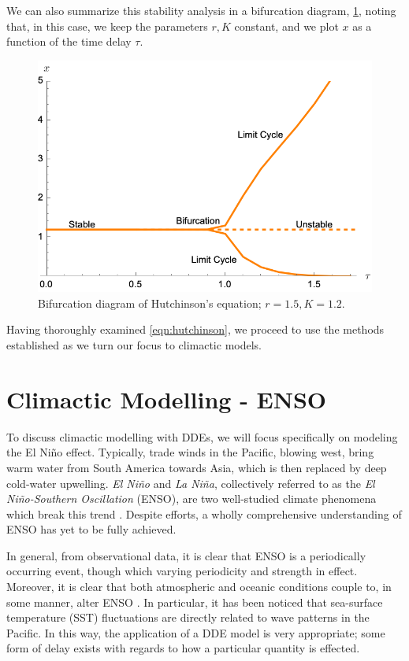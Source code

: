 \documentclass[12pt]{article}
\begin{document}
We can also summarize this stability analysis in a bifurcation diagram, \cref{fig:bifurcationdiagramex2}, noting that, in this case, we keep the parameters $r, K$ constant, and we plot $x$ as a function of the time delay $\tau$.

\begin{figure}[!ht]
    \centering
    \includegraphics*[width=0.4\linewidth]{figures/bifurcationdiagramexample2.png}
    \caption{Bifurcation diagram of Hutchinson's equation; $r = 1.5, K = 1.2$.}
    \label{fig:bifurcationdiagramex2}
\end{figure}

Having thoroughly examined \cref{eqn:hutchinson}, we proceed to use the methods established as we turn our focus to climactic models.
\newpage

\section{Climactic Modelling - ENSO}

To discuss climactic modelling with DDEs, we will focus specifically on modeling the El Niño effect. Typically, trade winds in the Pacific, blowing west, bring warm water from South America towards Asia, which is then replaced by deep cold-water upwelling. \emph{El Niño} and \emph{La Niña}, collectively referred to as the \emph{El Niño-Southern Oscillation} (ENSO), are two well-studied climate phenomena which break this trend \cite{aboutelnino}. Despite efforts, a wholly comprehensive understanding of ENSO has yet to be fully achieved.

In general, from observational data, it is clear that ENSO is a periodically occurring event, though which varying periodicity and strength in effect. Moreover, it is clear that both atmospheric and oceanic conditions couple to, in some manner, alter ENSO \cite{climatedde}. In particular, it has been noticed that sea-surface temperature (SST) fluctuations are directly related to wave patterns in the Pacific. In this way, the application of a DDE model is very appropriate; some form of delay exists with regards to how a particular quantity is effected.
\end{document}
